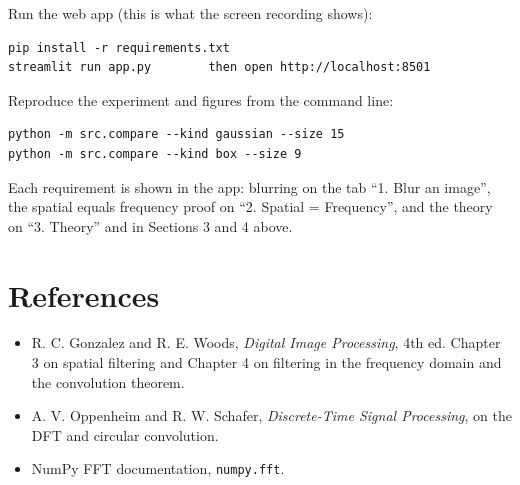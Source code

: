 \documentclass[11pt]{article}
\begin{document}
Run the web app (this is what the screen recording shows):
\begin{verbatim}
pip install -r requirements.txt
streamlit run app.py        then open http://localhost:8501
\end{verbatim}
Reproduce the experiment and figures from the command line:
\begin{verbatim}
python -m src.compare --kind gaussian --size 15
python -m src.compare --kind box --size 9
\end{verbatim}
Each requirement is shown in the app: blurring on the tab ``1. Blur an image'',
the spatial equals frequency proof on ``2. Spatial = Frequency'', and the theory
on ``3. Theory'' and in Sections 3 and 4 above.

\section{References}

\begin{itemize}
\item R. C. Gonzalez and R. E. Woods, \textit{Digital Image Processing}, 4th ed.
Chapter 3 on spatial filtering and Chapter 4 on filtering in the frequency
domain and the convolution theorem.
\item A. V. Oppenheim and R. W. Schafer, \textit{Discrete-Time Signal
Processing}, on the DFT and circular convolution.
\item NumPy FFT documentation, \texttt{numpy.fft}.
\end{itemize}
\end{document}

